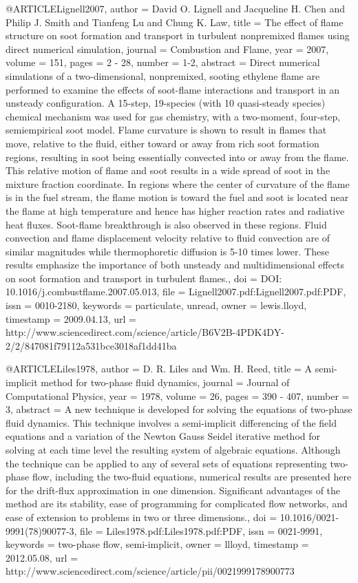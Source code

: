 {@ARTICLE{Lignell2007,
  author = {David O. Lignell and Jacqueline H. Chen and Philip J. Smith and Tianfeng
	Lu and Chung K. Law},
  title = {The effect of flame structure on soot formation and transport in
	turbulent nonpremixed flames using direct numerical simulation},
  journal = {Combustion and Flame},
  year = {2007},
  volume = {151},
  pages = {2 - 28},
  number = {1-2},
  abstract = {Direct numerical simulations of a two-dimensional, nonpremixed, sooting
	ethylene flame are performed to examine the effects of soot-flame
	interactions and transport in an unsteady configuration. A 15-step,
	19-species (with 10 quasi-steady species) chemical mechanism was
	used for gas chemistry, with a two-moment, four-step, semiempirical
	soot model. Flame curvature is shown to result in flames that move,
	relative to the fluid, either toward or away from rich soot formation
	regions, resulting in soot being essentially convected into or away
	from the flame. This relative motion of flame and soot results in
	a wide spread of soot in the mixture fraction coordinate. In regions
	where the center of curvature of the flame is in the fuel stream,
	the flame motion is toward the fuel and soot is located near the
	flame at high temperature and hence has higher reaction rates and
	radiative heat fluxes. Soot-flame breakthrough is also observed in
	these regions. Fluid convection and flame displacement velocity relative
	to fluid convection are of similar magnitudes while thermophoretic
	diffusion is 5-10 times lower. These results emphasize the importance
	of both unsteady and multidimensional effects on soot formation and
	transport in turbulent flames.},
  doi = {DOI: 10.1016/j.combustflame.2007.05.013},
  file = {Lignell2007.pdf:Lignell2007.pdf:PDF},
  issn = {0010-2180},
  keywords = {particulate, unread},
  owner = {lewis.lloyd},
  timestamp = {2009.04.13},
  url = {http://www.sciencedirect.com/science/article/B6V2B-4PDK4DY-2/2/847081f79112a531bce3018af1dd41ba}
}

@ARTICLE{Liles1978,
  author = {D. R. Liles and Wm. H. Reed},
  title = {A semi-implicit method for two-phase fluid dynamics},
  journal = {Journal of Computational Physics},
  year = {1978},
  volume = {26},
  pages = {390 - 407},
  number = {3},
  abstract = {A new technique is developed for solving the equations of two-phase
	fluid dynamics. This technique involves a semi-implicit differencing
	of the field equations and a variation of the Newton Gauss Seidel
	iterative method for solving at each time level the resulting system
	of algebraic equations. Although the technique can be applied to
	any of several sets of equations representing two-phase flow, including
	the two-fluid equations, numerical results are presented here for
	the drift-flux approximation in one dimension. Significant advantages
	of the method are its stability, ease of programming for complicated
	flow networks, and ease of extension to problems in two or three
	dimensions.},
  doi = {10.1016/0021-9991(78)90077-3},
  file = {Liles1978.pdf:Liles1978.pdf:PDF},
  issn = {0021-9991},
  keywords = {two-phase flow, semi-implicit},
  owner = {llloyd},
  timestamp = {2012.05.08},
  url = {http://www.sciencedirect.com/science/article/pii/0021999178900773}
}

}
